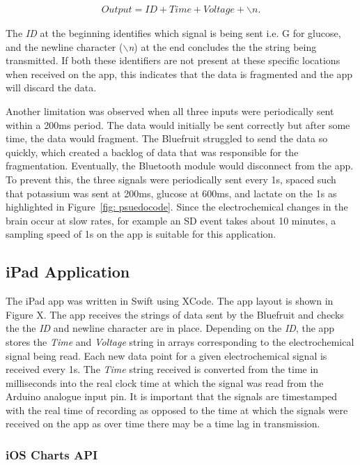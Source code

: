 \begin{align}
    Output = ID + Time + Voltage + \backslash n.
    \nonumber
\end{align}

The \textit{ID} at the beginning identifies which signal is being sent i.e. G for glucose, and the newline character (\textit{$\backslash$n}) at the end concludes the the string being transmitted. If both these identifiers are not present at these specific locations when received on the app, this indicates that the data is fragmented and the app will discard the data. 

Another limitation was observed when all three inputs were periodically sent within a 200ms period. The data would initially be sent correctly but after some time, the data would fragment. The Bluefruit struggled to send the data so quickly, which created a backlog of data that was responsible for the fragmentation. Eventually, the Bluetooth module would disconnect from the app. To prevent this, the three signals were periodically sent every 1s, spaced such that potassium was sent at 200ms, glucose at 600ms, and lactate on the 1s as highlighted in Figure~\ref{fig: psuedocode}. Since the electrochemical changes in the brain occur at slow rates, for example an SD event takes about 10 minutes, a sampling speed of 1s on the app is suitable for this application. 





\subsection{iPad Application}
The iPad app was written in Swift using XCode. The app layout is shown in Figure X. The app receives the strings of data sent by the Bluefruit and checks the the \textit{ID} and newline character are in place. Depending on the \textit{ID}, the app stores the \textit{Time} and \textit{Voltage} string in arrays corresponding to the electrochemical signal being read. Each new data point for a given electrochemical signal is received every 1s. The \textit{Time} string received is converted from the time in milliseconds into the real clock time at which the signal was read from the Arduino analogue input pin. It is important that the signals are timestamped with the real time of recording as opposed to the time at which the signals were received on the app as over time there may be a time lag in transmission.

\subsubsection{iOS Charts API}

